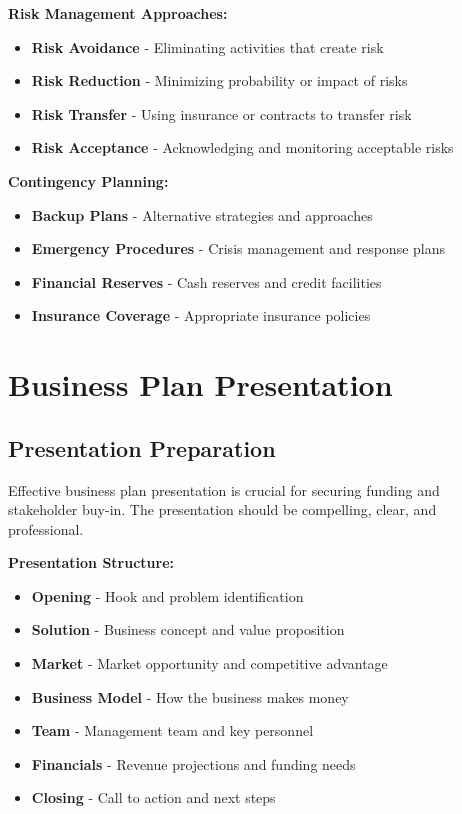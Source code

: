 \documentclass[12pt]{article}
\begin{document}
\textbf{Risk Management Approaches:}
\begin{itemize}
    \item \textbf{Risk Avoidance} - Eliminating activities that create risk
    \item \textbf{Risk Reduction} - Minimizing probability or impact of risks
    \item \textbf{Risk Transfer} - Using insurance or contracts to transfer risk
    \item \textbf{Risk Acceptance} - Acknowledging and monitoring acceptable risks
\end{itemize}

\textbf{Contingency Planning:}
\begin{itemize}
    \item \textbf{Backup Plans} - Alternative strategies and approaches
    \item \textbf{Emergency Procedures} - Crisis management and response plans
    \item \textbf{Financial Reserves} - Cash reserves and credit facilities
    \item \textbf{Insurance Coverage} - Appropriate insurance policies
\end{itemize}

\section{Business Plan Presentation}

\subsection{Presentation Preparation}
Effective business plan presentation is crucial for securing funding and stakeholder buy-in. The presentation should be compelling, clear, and professional.

\textbf{Presentation Structure:}
\begin{itemize}
    \item \textbf{Opening} - Hook and problem identification
    \item \textbf{Solution} - Business concept and value proposition
    \item \textbf{Market} - Market opportunity and competitive advantage
    \item \textbf{Business Model} - How the business makes money
    \item \textbf{Team} - Management team and key personnel
    \item \textbf{Financials} - Revenue projections and funding needs
    \item \textbf{Closing} - Call to action and next steps
\end{itemize}
\end{document}
